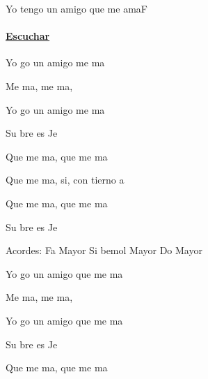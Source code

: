 \documentclass[12pt, spanish]{book}
\begin{document}
    \begin{song}{Yo tengo un amigo que me ama}{F}
        {} %
        {}
        {} %
        {}
        \ifChordBk
        \paragraph{\mbox{}\hfill\protect\href{https://open.spotify.com/intl-es/track/1hxUNYykzXr1awX0uqpqN1}{Escuchar}\mbox{}\hfill}
        \fi

        \begin{SBChorus}
            Yo go un amigo  me ma

            Me ma, me ma,

            Yo go un amigo  me ma

            Su bre es Je
        \end{SBChorus}

        \begin{SBOpGroup}
            Que me ma, que me ma

            Que me ma, si, con tierno a

            Que me ma, que me ma

            Su bre es Je
        \end{SBOpGroup}

        \ifChordBk
        \begin{SBOpGroup}
            Acordes:\break
            \upchord{\F}\qquad Fa Mayor \hfill
            \upchord{\Bflat}\qquad Si bemol Mayor \hfill\null\break
            \upchord{\C}\qquad Do Mayor \hfill
        \end{SBOpGroup}
        \fi
        \begin{SBExtraKeys}{

            \begin{SBChorus}
                Yo go un amigo que me ma

                Me ma, me ma,

                Yo go un amigo que me ma

                Su bre es Je
            \end{SBChorus}

            \begin{SBOpGroup}
                Que me ma, que me ma


\end{SBOpGroup}}
\end{SBExtraKeys}
\end{song}
\end{document}

